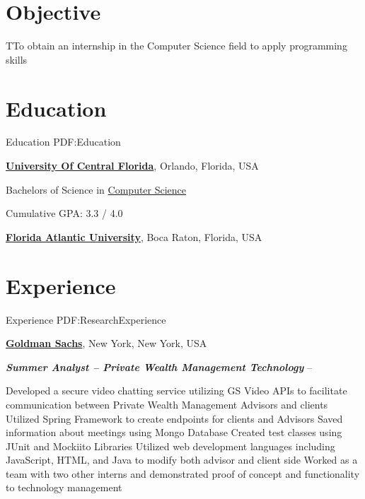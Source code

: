 \documentclass[letterpaper,MMMyyyy,nonstop]{simpleresumecv}
\begin{document}
\begin{body}
\vspace{-5mm}
\section
{Objective}
\hfill
TTo obtain an internship in the Computer Science field to apply programming skills

\section
{Education}
{Education}
{PDF:Education}

\href{http://www.ucf.edu/}
{\textbf{University Of Central Florida}},
Orlando, Florida, USA

\GapNoBreak
\BulletItem
Bachelors of Science in 
\href{http://catalog.ucf.edu/content/documents/programs/Computer_Science_BS.pdf}
{Computer Science}
\hfill {} 
\begin{detail}
\SubBulletItem
Cumulative GPA: 3.3 / 4.0
\end{detail}

\BigGap
\href{http://www.example.com/my-college}
{\textbf{Florida Atlantic University}},
Boca Raton, Florida, USA
\hfill
{}



\section
{Experience}
{Experience}
{PDF:ResearchExperience}


\href{http://www.goldmansachs.com/}
{\textbf{Goldman Sachs}},
New York, New York, USA

\Gap
\BulletItem
\textbf{\textit{Summer Analyst – Private Wealth Management Technology}}
\hfill
{} --
\begin{detail}
\SubBulletItem
\small Developed a secure video chatting service utilizing GS Video APIs to facilitate communication between Private Wealth Management Advisors and clients 
\SubBulletItem 
Utilized Spring Framework to create endpoints for clients and Advisors
\SubBulletItem
Saved information about meetings using Mongo Database
\SubBulletItem
Created test classes using JUnit and Mockiito Libraries
\SubBulletItem
Utilized web development languages including JavaScript, HTML, and Java to modify both advisor and client side
\SubBulletItem
Worked as a team with two other interns and demonstrated proof of concept and functionality to technology management


\end{detail}
\end{body}
\end{document}
